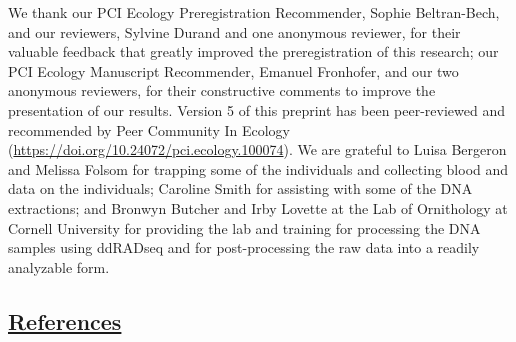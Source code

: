 \documentclass[
]{article}
\begin{document}
We thank our PCI Ecology Preregistration Recommender, Sophie
Beltran-Bech, and our reviewers, Sylvine Durand and one anonymous
reviewer, for their valuable feedback that greatly improved the
preregistration of this research; our PCI Ecology Manuscript
Recommender, Emanuel Fronhofer, and our two anonymous reviewers, for
their constructive comments to improve the presentation of our results.
Version 5 of this preprint has been peer-reviewed and recommended by
Peer Community In Ecology
(\url{https://doi.org/10.24072/pci.ecology.100074}). We are grateful to
Luisa Bergeron and Melissa Folsom for trapping some of the individuals
and collecting blood and data on the individuals; Caroline Smith for
assisting with some of the DNA extractions; and Bronwyn Butcher and Irby
Lovette at the Lab of Ornithology at Cornell University for providing
the lab and training for processing the DNA samples using ddRADseq and
for post-processing the raw data into a readily analyzable form.

\newpage

\hypertarget{references}{%
\subsection*{\texorpdfstring{\href{MyLibrary.bib}{References}}{References}}\label{references}}
\end{document}
